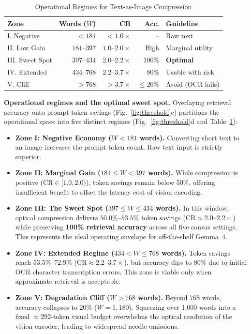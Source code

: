 \documentclass[conference]{IEEEtran}
\begin{document}
\begin{table}[t]
\caption{Operational Regimes for Text-as-Image Compression}
\label{tab:zones}
\centering
\footnotesize
\setlength{\tabcolsep}{3.2pt}
\begin{tabular}{lrrrl}
\toprule
\textbf{Zone} & \textbf{Words ($W$)} & \textbf{CR} & \textbf{Acc.} & \textbf{Guideline}\\
\midrule
I. Negative & $< 181$ & $< 1.0\times$ & -- & Raw text\\
II. Low Gain & $181$--$397$ & $1.0$--$2.0\times$ & High & Marginal utility\\
III. Sweet Spot & $397$--$434$ & $2.0$--$2.2\times$ & 100\% & \textbf{Optimal}\\
IV. Extended & $434$--$768$ & $2.2$--$3.7\times$ & 80\% & Usable with risk\\
V. Cliff & $> 768$ & $> 3.7\times$ & $\le 20\%$ & Avoid (OCR fails)\\
\bottomrule
\end{tabular}
\end{table}

\textbf{Operational regimes and the optimal sweet spot.}
Overlaying retrieval accuracy onto prompt token savings (Fig.~\ref{fig:threshold}c) partitions the operational space into five distinct regimes (Fig.~\ref{fig:threshold}d and Table~\ref{tab:zones}):
\begin{itemize}
\item \textbf{Zone I: Negative Economy ($W < 181$ words).} Converting short text to an image increases the prompt token count. Raw text input is strictly superior.
\item \textbf{Zone II: Marginal Gain ($181 \le W < 397$ words).} While compression is positive ($\mathrm{CR} \in [1.0, 2.0)$), token savings remain below $50\%$, offering insufficient benefit to offset the latency cost of vision encoding.
\item \textbf{Zone III: The Sweet Spot ($397 \le W \le 434$ words).} In this window, optical compression delivers $50.0\%$--$53.5\%$ token savings ($\mathrm{CR} \approx 2.0$--$2.2\times$) while preserving \textbf{100\% retrieval accuracy} across all five canvas settings. This represents the ideal operating envelope for off-the-shelf Gemma~4.
\item \textbf{Zone IV: Extended Regime ($434 < W \le 768$ words).} Token savings reach $53.5\%$--$72.9\%$ ($\mathrm{CR} \approx 2.2$--$3.7\times$), but accuracy dips to $80\%$ due to initial OCR character transcription errors. This zone is viable only when approximate retrieval is acceptable.
\item \textbf{Zone V: Degradation Cliff ($W > 768$ words).} Beyond $768$ words, accuracy collapses to $20\%$ ($W = 1{,}180$). Squeezing over 1{,}000 words into a fixed $\approx 292$-token visual budget overwhelms the optical resolution of the vision encoder, leading to widespread needle omissions.
\end{itemize}
\end{document}
